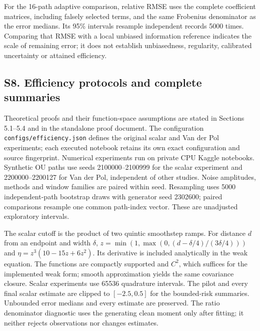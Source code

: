 \documentclass[
  american,
  11pt,
]{article}
\begin{document}
For the 16-path adaptive comparison, relative RMSE uses the complete
coefficient matrices, including falsely selected terms, and the same
Frobenius denominator as the error medians. Its 95\% intervals resample
independent records 5000 times. Comparing that RMSE with a local
unbiased information reference indicates the scale of remaining error;
it does not establish unbiasedness, regularity, calibrated uncertainty
or attained efficiency.

\subsection{S8. Efficiency protocols and complete
summaries}\label{s8.-efficiency-protocols-and-complete-summaries}

Theoretical proofs and their function-space assumptions are stated in
Sections 5.1--5.4 and in the standalone proof document. The
configuration \texttt{configs/efficiency.json} defines the original
scalar and Van der Pol experiments; each executed notebook retains its
own exact configuration and source fingerprint. Numerical experiments
run on private CPU Kaggle notebooks. Synthetic OU paths use seeds
2100000--2100999 for the scalar experiment and 2200000--2200127 for Van
der Pol, independent of other studies. Noise amplitudes, methods and
window families are paired within seed. Resampling uses 5000
independent-path bootstrap draws with generator seed 2302600; paired
comparisons resample one common path-index vector. These are unadjusted
exploratory intervals.

The scalar cutoff is the product of two quintic smoothstep ramps. For
distance \(d\) from an endpoint and width \(\delta\),
\(z=\min(1,\max(0,(d-\delta/4)/(3\delta/4)))\) and
\(\eta=z^3(10-15z+6z^2)\). Its derivative is included analytically in
the weak equation. The functions are compactly supported and \(C^2\),
which suffices for the implemented weak form; smooth approximation
yields the same covariance closure. Scalar experiments use 65536
quadrature intervals. The pilot and every final scalar estimate are
clipped to \([-2.5,0.5]\) for the bounded-risk summaries. Unbounded
error medians and every estimate are preserved. The ratio denominator
diagnostic uses the generating clean moment only after fitting; it
neither rejects observations nor changes estimates.
\end{document}
